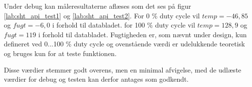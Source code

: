 Under debug kan måleresultaterne aflæses som det ses på figur \ref{lab:sht_api_test1} og \ref{lab:sht_api_test2}. 
For 0 \% duty cycle vil $temp = -46,85$ og $fugt = -6,0$ i forhold til databladet.
for 100 \% duty cycle vil $temp = 128,9$ og $fugt = 119$ i forhold til databladet.
Fugtigheden er, som nævnt under design, kun defineret ved 0...100 \% duty cycle og ovenstående værdi er udelukkende teoretisk og bruges kun for at teste funktionen. 

Disse værdier stemmer godt overens, men en minimal afvigelse, med de udlæste værdier for debug og testen kan derfor antages som godkendt.